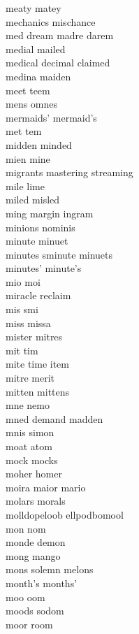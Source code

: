 meaty matey\\
mechanics mischance\\
med dream madre darem  \\
medial mailed\\
medical decimal claimed\\
medina maiden\\
meet teem\\
mens omnes \\
mermaids' mermaid's\\
met tem\\
midden minded\\
mien mine\\
migrants mastering streaming \\
mile lime\\
miled misled \\
ming margin ingram  \\
minions nominis\\
minute minuet\\
minutes sminute minuets\\
minutes' minute's\\
mio moi\\
miracle reclaim\\
mis smi\\
miss missa \\
mister mitres\\
mit tim\\
mite time item\\
mitre merit\\
mitten mittens \\
mne nemo \\
mned demand madden  \\
mnis simon \\
moat atom\\
mock mocks \\
moher homer\\
moira maior mario\\
molars morals\\
molldopeloob ellpodbomool\\
mon nom\\
monde demon\\
mong mango \\
mons solemn melons  \\
month's months'\\
moo oom\\
moods sodom\\
moor room\\
